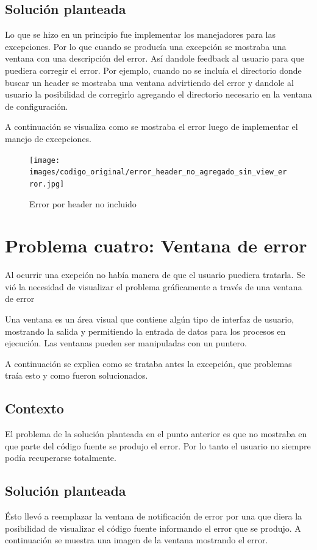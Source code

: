 \documentclass[a4paper,oneside,10pt]{article}
\begin{document}
\subsection{Soluci\'on planteada}
Lo que se hizo en un principio fue implementar los manejadores para las excepciones. Por lo que cuando se produc\'ia una excepci\'on se mostraba una ventana con una descripci\'on del error. As\'i dandole feedback al usuario para que puediera corregir el error. Por ejemplo, cuando no se inclu\'ia el directorio donde buscar un header se mostraba una ventana advirtiendo del error y dandole al usuario la posibilidad de corregirlo agregando el directorio necesario en la ventana de configuraci\'on.

A continuaci\'on se visualiza como se mostraba el error luego de implementar el manejo de excepciones.

\begin{figure}[h!]
  \centering
    \texttt{[image: images/codigo\_original/error\_header\_no\_agregado\_sin\_view\_error.jpg]}
     \caption{Error por header no incluido}
\end{figure}

\section{Problema cuatro: Ventana de error}

Al ocurrir una exepci\'on no hab\'ia manera de que el usuario puediera tratarla. Se vi\'o la necesidad de visualizar el problema gr\'aficamente a trav\'es de una ventana de error

Una ventana es un \'area visual que contiene alg\'un tipo de interfaz de usuario, mostrando la salida y permitiendo la entrada de datos para los procesos en ejecuci\'on. Las ventanas pueden ser manipuladas con un puntero.

A continuaci\'on se explica como se trataba antes la excepci\'on, que problemas tra\'ia esto y como fueron solucionados.

\subsection{Contexto}
El problema de la soluci\'on planteada en el punto anterior es que no mostraba en que parte del c\'odigo fuente se produjo el error. Por lo tanto el usuario no siempre pod\'ia recuperarse totalmente.

\subsection{Soluci\'on planteada}
\'Esto llev\'o a reemplazar la ventana de notificaci\'on de error por una que diera la posibilidad de visualizar el c\'odigo fuente informando el error que se produjo. A continuación se muestra una imagen de la ventana mostrando el error.
\end{document}
